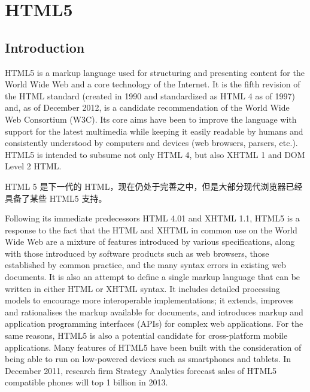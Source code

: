 \part{HTML5}


\chapter{Introduction}

HTML5 is a markup language used for structuring and presenting content for the World Wide Web and a core technology of the Internet. It is the fifth revision of the HTML standard (created in 1990 and standardized as HTML 4 as of 1997) and, as of December 2012, is a candidate recommendation of the World Wide Web Consortium (W3C). Its core aims have been to improve the language with support for the latest multimedia while keeping it easily readable by humans and consistently understood by computers and devices (web browsers, parsers, etc.). HTML5 is intended to subsume not only HTML 4, but also XHTML 1 and DOM Level 2 HTML.

HTML 5 是下一代的 HTML，现在仍处于完善之中，但是大部分现代浏览器已经具备了某些 HTML5 支持。

Following its immediate predecessors HTML 4.01 and XHTML 1.1, HTML5 is a response to the fact that the HTML and XHTML in common use on the World Wide Web are a mixture of features introduced by various specifications, along with those introduced by software products such as web browsers, those established by common practice, and the many syntax errors in existing web documents. It is also an attempt to define a single markup language that can be written in either HTML or XHTML syntax. It includes detailed processing models to encourage more interoperable implementations; it extends, improves and rationalises the markup available for documents, and introduces markup and application programming interfaces (APIs) for complex web applications. For the same reasons, HTML5 is also a potential candidate for cross-platform mobile applications. Many features of HTML5 have been built with the consideration of being able to run on low-powered devices such as smartphones and tablets. In December 2011, research firm Strategy Analytics forecast sales of HTML5 compatible phones will top 1 billion in 2013.

